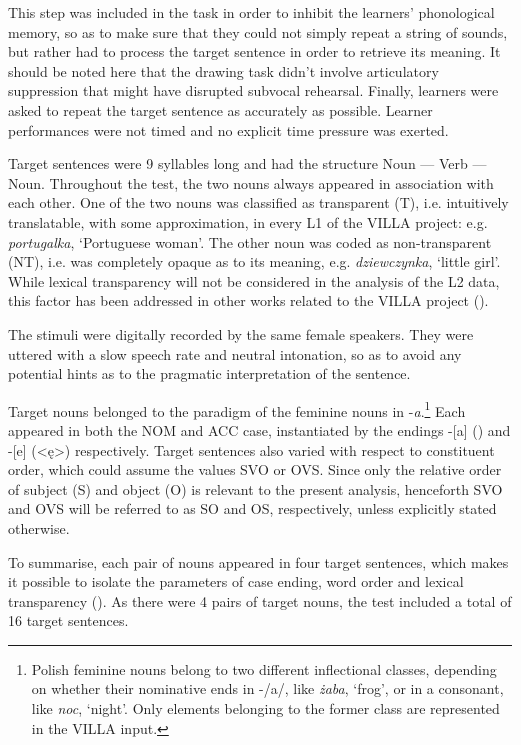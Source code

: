This step was included in the task in order to inhibit the learners' phonological memory, so as to make sure that they could not simply repeat a string of sounds, but rather had to process the target sentence in order to retrieve its meaning. It should be noted here that the drawing task didn’t involve articulatory suppression that might have disrupted subvocal rehearsal. Finally, learners were asked to repeat the target sentence as accurately as possible. Learner performances were not timed and no explicit time pressure was exerted.

Target sentences were 9 syllables long and had the structure Noun — Verb — Noun. Throughout the test, the two nouns always appeared in association with each other. One of the two nouns was classified as transparent (T), i.e. intuitively translatable, with some approximation, in every L1 of the VILLA project: e.g. \textit{portugalka}, ‘Portuguese woman’. The other noun was coded as non-transparent (NT), i.e. was completely opaque as to its meaning, e.g. \textit{dziewczynka}, ‘little girl’. While lexical transparency will not be considered in the analysis of the L2 data, this factor has been addressed in other works related to the VILLA project (\citealt{HinzEtAl2013, Saturno2014, Rast2015}). 

The stimuli were digitally recorded by the same female speakers. They were uttered with a slow speech rate and neutral intonation, so as to avoid any potential hints as to the pragmatic interpretation of the sentence. 

\largerpage
Target nouns belonged to the paradigm of the feminine nouns in -\textit{a}.\footnote{Polish feminine nouns belong to two different inflectional classes, depending on whether their nominative ends in -/a/, like \textit{żaba}, ‘frog’, or in a consonant, like \textit{noc}, ‘night’. Only elements belonging to the former class are represented in the VILLA input.} Each appeared in both the NOM and ACC case, instantiated by the endings -[a] (\textrangle) and -[e] (<ę>) respectively. Target sentences also varied with respect to constituent order, which could assume the values SVO or OVS. Since only the relative order of subject (S) and object (O) is relevant to the present analysis, henceforth SVO and OVS will be referred to as SO and OS, respectively, unless explicitly stated otherwise.

To summarise, each pair of nouns appeared in four target sentences, which makes it possible to isolate the parameters of case ending, word order and lexical transparency (). As there were 4 pairs of target nouns, the test included a total of 16 target sentences.

